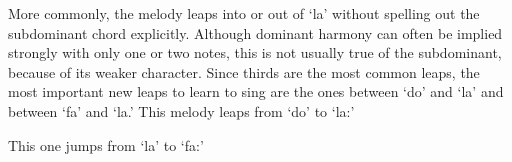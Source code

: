 \documentclass{sight}
\begin{document}
\pagebreak[3]\par
\vspace{5mm}\begin{samepage}More commonly, the melody leaps into or out of `la' without spelling out the subdominant chord explicitly. Although dominant harmony can often be implied strongly with only one or two notes, this is not usually true of the subdominant, because of its weaker character. Since thirds are the most common leaps, the most important new leaps to learn to sing are the ones between `do' and `la' and between `fa' and `la.' This melody leaps from `do' to `la:'\\


\pagebreak[3]\par
\par
{}
\label{tune:238}%
{%
\parindent 0pt
\noindent
\ifx\preLilyPondExample \undefined
\else
  \expandafter\preLilyPondExample
\fi
\def\lilypondbook{}%

\ifx\postLilyPondExample \undefined
\else
  \expandafter\postLilyPondExample
\fi
}
\end{samepage}


\pagebreak[3]\par
\vspace{5mm}\begin{samepage}This one jumps from `la' to `fa:'\\


\pagebreak[3]\par
\par
{}
\label{tune:239}%
{%
\parindent 0pt
\noindent
\ifx\preLilyPondExample \undefined
\else
  \expandafter\preLilyPondExample
\fi
\def\lilypondbook{}%

\ifx\postLilyPondExample \undefined
\else
  \expandafter\postLilyPondExample
\fi
}
\end{samepage}
\end{document}
